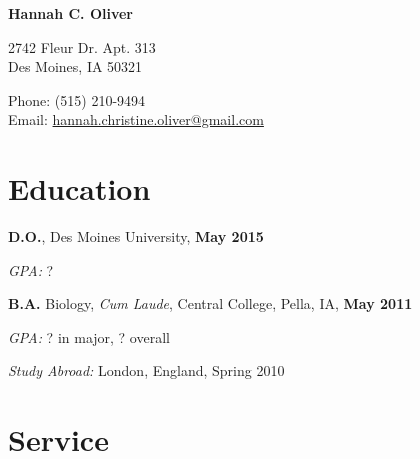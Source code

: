 \documentclass[10pt,letterpaper]{article}
\def\name{Hannah C. Oliver}
\renewenvironment{itemize}{
  \begin{list}{}{
      \setlength{\leftmargin}{1.5em}
      \setlength{\itemsep}{0.25em}
      \setlength{\parskip}{0pt}
      \setlength{\parsep}{0.25em}
    }
  }{
  \end{list}
}
\begin{document}

\centerline{\huge \bf \name}

\bigskip

\begin{minipage}[t]{0.5\textwidth}
  2742 Fleur Dr. Apt. 313 \\
  Des Moines, IA 50321
\end{minipage}
\begin{minipage}[t]{0.5\textwidth}
  Phone: (515) 210-9494 \\
  Email: \href{mailto:hannah.christine.oliver@gmail.com}{hannah.christine.oliver@gmail.com}
\end{minipage}

\section*{Education}

\begin{itemize}
\item \textbf{D.O.}, Des Moines University, \hfill \textbf{May 2015}
  \begin{itemize}
  \item \textit{GPA:}
    ?
  \end{itemize}
\item \textbf{B.A.} Biology, \textit{Cum Laude}, Central
  College, Pella, IA, \hfill \textbf{May 2011}
  \begin{itemize}
  \item \textit{GPA:}
    ? in major, ? overall
  \item \textit{Study Abroad:} London, England, Spring 2010
  \end{itemize}
\end{itemize}

\section*{Service}
\end{document}
